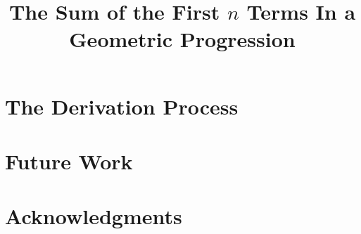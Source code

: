 \title{The Sum of the First $n$ Terms In a Geometric Progression}

\maketitle\tableofcontents\clearpage



\section{The Derivation Process}


\section{Future Work}


\section{Acknowledgments}
\clearpage

\clearpage

\appendix


